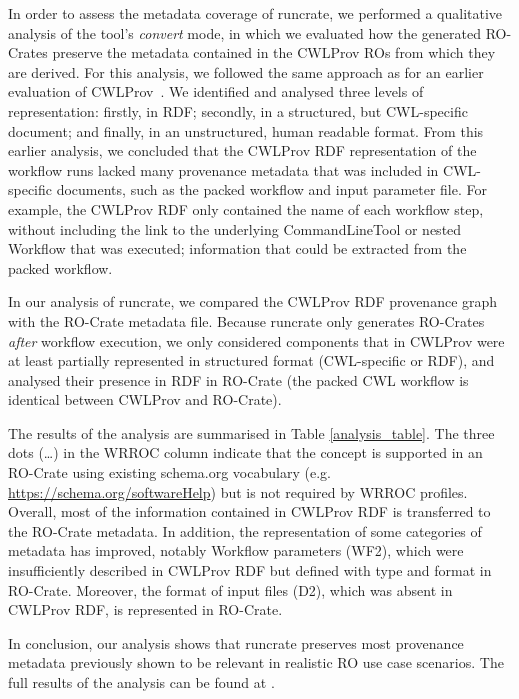 \documentclass[10pt,letterpaper]{article}
\begin{document}
In order to assess the metadata coverage of runcrate, we performed a qualitative analysis of the tool's \emph{convert} mode, in which we evaluated how the generated RO-Crates preserve the metadata contained in the CWLProv ROs from which they are derived.
For this analysis, we followed the same approach as for an earlier evaluation of CWLProv~\cite{De Wit 2022}.
We identified and analysed three levels of representation:
firstly, in RDF; secondly, in a structured, but CWL-specific document;
and finally, in an unstructured, human readable format.
From this earlier analysis, we concluded that the CWLProv RDF representation of the workflow runs lacked many provenance metadata that was included in CWL-specific documents, such as the packed workflow and input parameter file.
For example, the CWLProv RDF only contained the name of each workflow step, without including the link to the underlying CommandLineTool or nested Workflow that was executed; information that could be extracted from the packed workflow.

In our analysis of runcrate, we compared the CWLProv RDF provenance graph with the RO-Crate metadata file.
Because runcrate only generates RO-Crates \emph{after} workflow execution, we only considered components that in CWLProv were at least partially represented in structured format (CWL-specific or RDF), and analysed their presence in RDF in RO-Crate (the packed CWL workflow is identical between CWLProv and RO-Crate).

The results of the analysis are summarised in Table
\ref{analysis_table}.
The three dots (…) in the WRROC column indicate that  the concept is supported in an RO-Crate using existing schema.org vocabulary (e.g. \url{https://schema.org/softwareHelp}) but is not required by WRROC profiles.
Overall, most of the information contained in CWLProv RDF is transferred to the RO-Crate metadata.
In addition, the representation of some categories of metadata has improved, notably Workflow parameters (WF2), which were insufficiently described in CWLProv RDF but defined with type and format in RO-Crate.
Moreover, the format of input files (D2), which was absent in CWLProv RDF, is represented in RO-Crate.

In conclusion, our analysis shows that runcrate preserves most provenance metadata previously shown to be relevant in realistic RO use case scenarios.
The full results of the analysis can be found at \cite{de Wit 2023}.
\end{document}
